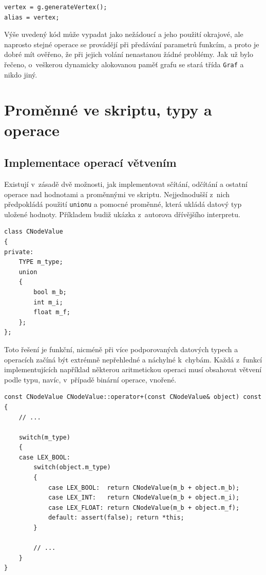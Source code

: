 \documentclass[11pt,twoside,a4paper]{book}
\begin{document}
\begin{verbatim}
vertex = g.generateVertex();
alias = vertex;
\end{verbatim}

Výše uvedený kód může vypadat jako nežádoucí a jeho použití okrajové, ale naprosto stejné operace se provádějí při předávání parametrů funkcím, a proto je dobré mít ověřeno, že při jejich volání nenastanou žádné problémy. Jak už bylo řečeno, o~veškerou dynamicky alokovanou paměť grafu se stará třída \texttt{Graf} a nikdo jiný.


\section{Proměnné ve skriptu, typy a operace}

\subsection{Implementace operací větvením}

Existují v~zásadě dvě možnosti, jak implementovat sčítání, odčítání a ostatní operace nad hodnotami a proměnnými ve skriptu. Nejjednodušší z~nich předpokládá použití \texttt{unionu} a pomocné proměnné, která ukládá datový typ uložené hodnoty. Příkladem budiž ukázka z~autorova dřívějšího interpretu.

\begin{verbatim}
class CNodeValue
{
private:
    TYPE m_type;
    union
    {
        bool m_b;
        int m_i;
        float m_f;
    };
};
\end{verbatim}

Toto řešení je funkční, nicméně při více podporovaných datových typech a operacích začíná být extrémně nepřehledné a náchylné k~chybám. Každá z~funkcí implementujících například některou aritmetickou operaci musí obsahovat větvení podle typu, navíc, v~případě binární operace, vnořené.

\begin{verbatim}
const CNodeValue CNodeValue::operator+(const CNodeValue& object) const
{
    // ...

    switch(m_type)
    {
    case LEX_BOOL:
        switch(object.m_type)
        {
            case LEX_BOOL:  return CNodeValue(m_b + object.m_b);
            case LEX_INT:   return CNodeValue(m_b + object.m_i);
            case LEX_FLOAT: return CNodeValue(m_b + object.m_f);
            default: assert(false); return *this;
        }

        // ...
    }
}
\end{verbatim}
\end{document}
